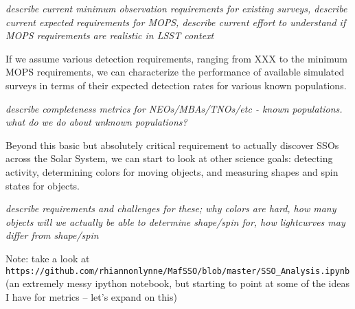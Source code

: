 {\it describe current minimum observation requirements for existing
  surveys, describe current expected requirements for MOPS, describe
  current effort to understand if MOPS requirements are realistic in
  LSST context}

If we assume various detection requirements, ranging from XXX to the
minimum MOPS requirements, we can characterize the performance of
available simulated surveys in terms of their expected detection rates
for various known populations.

{\it describe completeness metrics for NEOs/MBAs/TNOs/etc - known
  populations. what do we do about unknown populations?}

Beyond this basic but absolutely critical requirement to actually
discover SSOs across the Solar System, we can start to look at other
science goals: detecting activity, determining colors for moving
objects, and measuring shapes and spin states for objects.

{\it describe requirements and challenges for these; why colors are
  hard, how many objects will we actually be able to determine
  shape/spin for, how lightcurves may differ from shape/spin}

Note: take a look at
\texttt{https://github.com/rhiannonlynne/MafSSO/blob/master/SSO\_Analysis.ipynb}
(an extremely messy ipython notebook, but starting to point at some of
the ideas I have for metrics -- let's expand on this)

\navigationbar

